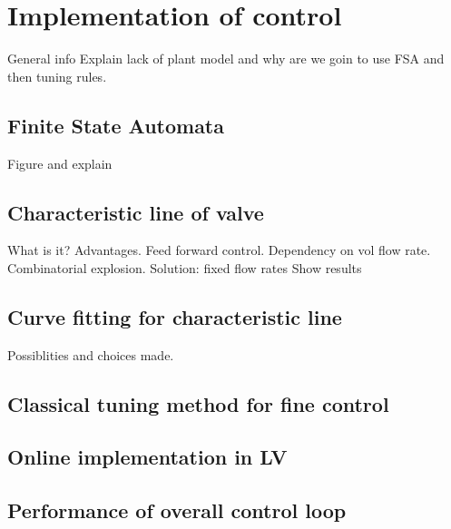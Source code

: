 \documentclass[main.tex]{subfiles}
\begin{document}
%
\chapter[Implementation of control]{Implementation of control}
General info
Explain lack of plant model and why are we goin to use FSA and then tuning rules.
%
\section[Finite State Automata]{Finite State Automata}
Figure and explain
%
\section[Characteristic line of valve]{Characteristic line of valve}
What is it? Advantages. Feed forward control.
Dependency on vol flow rate. Combinatorial explosion.
Solution:  fixed flow rates
Show results
%
\section[Curve fitting for characteristic line]{Curve fitting for characteristic line}
Possiblities and choices made. 
%
\section[Classical tuning method for fine control]{Classical tuning method for fine control}
%
\section[Online implementation in LV]{Online implementation in LV}
%
\section[Performace of overall control loop]{Performance of overall control loop}
%
\end{document}
